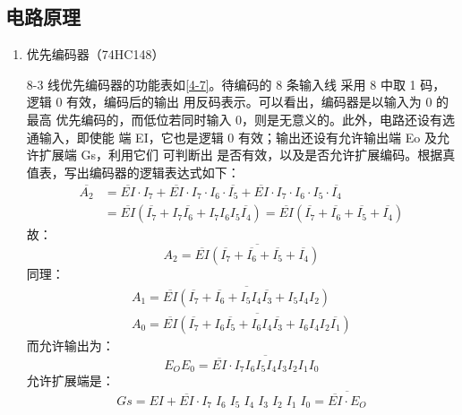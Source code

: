 \subsection{电路原理}

\begin{enumerate}
  \item 优先编码器（74HC148）
  
  8-3 线优先编码器的功能表如\cref{4-7}。待编码的 8 条输入线 采用 8 中取 1 
  码，逻辑 0 有效，编码后的输出 用反码表示。可以看出，编码器是以输入为 0 的最高
  优先编码的，而低位若同时输入 0，则是无意义的。此外，电路还设有选通输入，即使能
  端 EI，它也是逻辑 0 有效；输出还设有允许输出端 Eo 及允许扩展端 Gs，利用它们
  可判断出 是否有效，以及是否允许扩展编码。根据真值表，写出编码器的逻辑表达式如下：
  \begin{equation}
    \begin{aligned}
      \overline{A_2}&=\overline{EI}\cdot I_7+\overline{EI}\cdot I_7\cdot I_6\cdot\overline{I_5}+\overline{EI}\cdot I_7\cdot I_6\cdot I_5\cdot\overline{I_4}\\
      &=\overline{EI}(\overline{I_7}+I_7\overline{I_6}+I_7I_6I_5\overline{I_4})=\overline{EI}(\overline{I_7}+\overline{I_6}+\overline{I_5}+\overline{I_4})
    \end{aligned}
  \end{equation}
  故：
  \begin{equation}
    A_2=\overline{\overline{EI}(\overline{I_7}+\overline{I_6}+\overline{I_5}+\overline{I_4})}
  \end{equation}
  同理：
  \begin{gather}
    A_1=\overline{\overline{EI}(\overline{I_7}+\overline{I_6}+I_5I_4\overline{I_3}+I_5I_4I_2)}\\
    A_0=\overline{\overline{EI}(\overline{I_7}+I_6\overline{I_5}+I_6I_4\overline{I_3}+I_6I_4I_2\overline{I_1})}
  \end{gather}
  而允许输出为：
  \begin{equation}
    E_OE_0=\overline{\overline{EI}\cdot I_7I_6I_5I_4I_3I_2I_1I_0}
  \end{equation}
  允许扩展端是：
  \begin{equation}
    Gs=EI+\overline{EI}\cdot I_7\;I_6\;I_5\;I_4\;I_3\;I_2\;I_1\;I_0=\overline{\overline{EI}\cdot E_O}
  \end{equation}


\end{enumerate}
